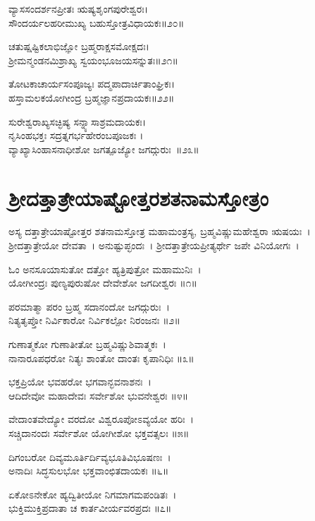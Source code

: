 ವ್ಯಾಸಸಂದರ್ಶನಪ್ರೀತಃ ಋಷ್ಯಶೃಂಗಪುರೇಶ್ವರಃ।\\
ಸೌಂದರ್ಯಲಹರೀಮುಖ್ಯ ಬಹುಸ್ತೋತ್ರವಿಧಾಯಕಃ॥೨೦॥

ಚತುಷ್ಷಷ್ಟಿಕಲಾಭಿಜ್ಞೋ ಬ್ರಹ್ಮರಾಕ್ಷಸಮೋಕ್ಷದಃ।\\
 ಶ್ರೀಮನ್ಮಂಡನಮಿಶ್ರಾಖ್ಯ ಸ್ವಯಂಭೂಜಯಸನ್ನುತಃ॥೨೧॥

 ತೋಟಕಾಚಾರ್ಯಸಂಪೂಜ್ಯಃ  ಪದ್ಮಪಾದಾರ್ಚಿತಾಂಘ್ರಿಕಃ।\\
 ಹಸ್ತಾಮಲಕಯೋಗೀಂದ್ರ ಬ್ರಹ್ಮಜ್ಞಾನಪ್ರದಾಯಕಃ॥೨೨॥

 ಸುರೇಶ್ವರಾಖ್ಯಸಚ್ಛಿಷ್ಯ ಸನ್ನ್ಯಾಸಾಶ್ರಮದಾಯಕಃ।\\
 ನೃಸಿಂಹಭಕ್ತಃ  ಸದ್ರತ್ನಗರ್ಭಹೇರಂಬಪೂಜಕಃ ।\\
 ವ್ಯಾಖ್ಯಾಸಿಂಹಾಸನಾಧೀಶೋ ಜಗತ್ಪೂಜ್ಯೋ ಜಗದ್ಗುರುಃ~॥೨೩॥
\section{ಶ್ರೀದತ್ತಾತ್ರೇಯಾಷ್ಟೋತ್ತರಶತನಾಮಸ್ತೋತ್ರಂ}
ಅಸ್ಯ ದತ್ತಾತ್ರೇಯಾಷ್ಟೋತ್ತರ ಶತನಾಮಸ್ತೋತ್ರ ಮಹಾಮಂತ್ರಸ್ಯ, ಬ್ರಹ್ಮವಿಷ್ಣುಮಹೇಶ್ವರಾ ಋಷಯಃ~। ಶ್ರೀದತ್ತಾತ್ರೇಯೋ ದೇವತಾ~। ಅನುಷ್ಟುಪ್ಛಂದಃ~। ಶ್ರೀದತ್ತಾತ್ರೇಯಪ್ರೀತ್ಯರ್ಥೇ ಜಪೇ ವಿನಿಯೋಗಃ~।\\

ಓಂ ಅನಸೂಯಾಸುತೋ ದತ್ತೋ ಹ್ಯತ್ರಿಪುತ್ರೋ ಮಹಾಮುನಿಃ~।\\
ಯೋಗೀಂದ್ರಃ ಪುಣ್ಯಪುರುಷೋ ದೇವೇಶೋ ಜಗದೀಶ್ವರಃ ॥೧॥

ಪರಮಾತ್ಮಾ ಪರಂ ಬ್ರಹ್ಮ ಸದಾನಂದೋ ಜಗದ್ಗುರುಃ~।\\
ನಿತ್ಯತೃಪ್ತೋ ನಿರ್ವಿಕಾರೋ ನಿರ್ವಿಕಲ್ಪೋ ನಿರಂಜನಃ ॥೨॥

ಗುಣಾತ್ಮಕೋ ಗುಣಾತೀತೋ ಬ್ರಹ್ಮವಿಷ್ಣುಶಿವಾತ್ಮಕಃ~।\\
ನಾನಾರೂಪಧರೋ ನಿತ್ಯಃ ಶಾಂತೋ ದಾಂತಃ ಕೃಪಾನಿಧಿಃ ॥೩॥

ಭಕ್ತಪ್ರಿಯೋ ಭವಹರೋ ಭಗವಾನ್ಭವನಾಶನಃ~।\\
ಆದಿದೇವೋ ಮಹಾದೇವಃ ಸರ್ವೇಶೋ ಭುವನೇಶ್ವರಃ ॥೪॥

ವೇದಾಂತವೇದ್ಯೋ ವರದೋ ವಿಶ್ವರೂಪೋಽವ್ಯಯೋ ಹರಿಃ~।\\
ಸಚ್ಚಿದಾನಂದಃ ಸರ್ವೇಶೋ ಯೋಗೀಶೋ ಭಕ್ತವತ್ಸಲಃ ॥೫॥

ದಿಗಂಬರೋ ದಿವ್ಯಮೂರ್ತಿರ್ದಿವ್ಯಭೂತಿವಿಭೂಷಣಃ~।\\
ಅನಾದಿಃ ಸಿದ್ಧಸುಲಭೋ ಭಕ್ತವಾಂಛಿತದಾಯಕಃ ॥೬॥

ಏಕೋಽನೇಕೋ ಹ್ಯದ್ವಿತೀಯೋ ನಿಗಮಾಗಮಪಂಡಿತಃ~।\\
ಭುಕ್ತಿಮುಕ್ತಿಪ್ರದಾತಾ ಚ ಕಾರ್ತವೀರ್ಯವರಪ್ರದಃ ॥೭॥

